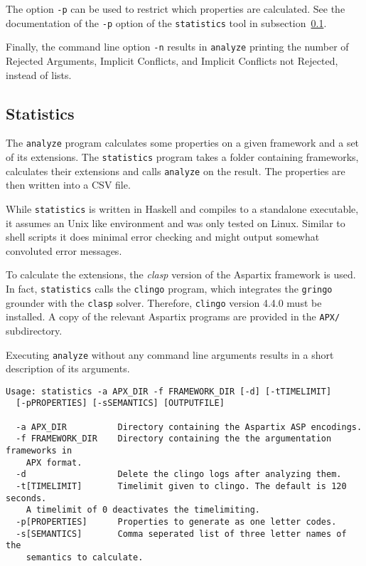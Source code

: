\documentclass[parskip=half]{scrartcl}
\begin{document}
The option \texttt{-p} can be used to restrict which properties are
calculated. See the documentation of the \texttt{-p} option of the
\texttt{statistics} tool in subsection~\ref{statistics}.

Finally, the command line option \texttt{-n} results in \texttt{analyze}
printing the number of Rejected Arguments, Implicit Conflicts, and Implicit
Conflicts not Rejected, instead of lists.

\subsection{Statistics}
\label{statistics}

The \texttt{analyze} program calculates some properties on a given framework and
a set of its extensions. The \texttt{statistics} program takes a folder
containing frameworks, calculates their extensions and calls \texttt{analyze} on
the result. The properties are then written into a CSV file.

While \texttt{statistics} is written in Haskell and compiles to a standalone
executable, it assumes an Unix like environment and was only tested on Linux.
Similar to shell scripts it does minimal error checking and might output
somewhat convoluted error messages.

To calculate the extensions, the \emph{clasp} version of the Aspartix framework
is used.  In fact, \texttt{statistics} calls the \texttt{clingo} program, which
integrates the \texttt{gringo} grounder with the \texttt{clasp} solver. Therefore,
\texttt{clingo} version 4.4.0 must be installed.  A copy of the relevant
Aspartix programs are provided in the \texttt{APX/} subdirectory.

Executing \texttt{analyze} without any command line arguments results in a short
description of its arguments.
\begin{verbatim}
Usage: statistics -a APX_DIR -f FRAMEWORK_DIR [-d] [-tTIMELIMIT]
  [-pPROPERTIES] [-sSEMANTICS] [OUTPUTFILE]

  -a APX_DIR          Directory containing the Aspartix ASP encodings.
  -f FRAMEWORK_DIR    Directory containing the the argumentation frameworks in
    APX format.
  -d                  Delete the clingo logs after analyzing them.
  -t[TIMELIMIT]       Timelimit given to clingo. The default is 120 seconds.
    A timelimit of 0 deactivates the timelimiting.
  -p[PROPERTIES]      Properties to generate as one letter codes.
  -s[SEMANTICS]       Comma seperated list of three letter names of the
    semantics to calculate.
\end{verbatim}
\end{document}
